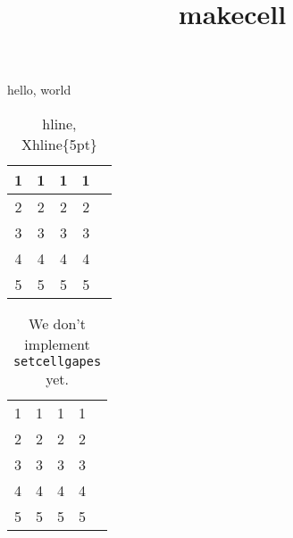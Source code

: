\documentclass{amsart}
\title{makecell}
\begin{document}
\maketitle

hello, world

\begin{table}[h]
\caption{hline, Xhline\{5pt\}}
\begin{tabular}{ccccc}
1 & 1 & 1 & 1 \\\hline
2 & 2 & 2 & 2 \\\Xhline{5pt}
3 & 3 & 3 & 3 \\
4 & 4 & 4 & 4 \\
5 & 5 & 5 & 5
\end{tabular}
\end{table}

\begin{table}[h]
\caption{We don't implement \texttt{setcellgapes} yet.}
    \setcellgapes{5pt}
\makegapedcells
\begin{tabular}{ccccc}
1 & 1 & 1 & 1 \\
2 & 2 & 2 & 2 \\
3 & 3 & 3 & 3 \\
4 & 4 & 4 & 4 \\
5 & 5 & 5 & 5
\end{tabular}
\end{table}
\end{document}
